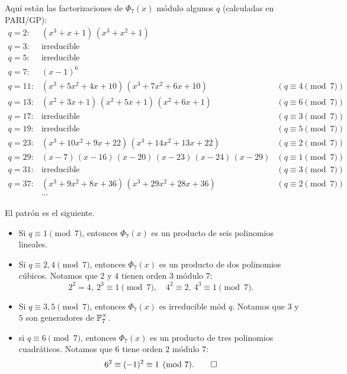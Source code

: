 \begin{ejemplo}
  Aquí están las factorizaciones de $\Phi_7 (x)$ módulo algunos $q$
  (calculadas en PARI/GP):
  \begin{align*}
    q = 2\colon & (x^3 + x + 1)\,(x^3 + x^2 + 1) \\
    q = 3\colon & \text{irreducible} \\
    q = 5\colon & \text{irreducible} \\
    q = 7\colon & (x - 1)^6 \\
    q = 11\colon & (x^3 + 5x^2 + 4x + 10)\,(x^3 + 7x^2 + 6x + 10) & (q \equiv 4 \pmod{7}) \\
    q = 13\colon & (x^2 + 3x + 1)\,(x^2 + 5x + 1)\,(x^2 + 6x + 1) & (q \equiv 6 \pmod{7}) \\
    q = 17\colon & \text{irreducible}  & (q \equiv 3 \pmod{7}) \\
    q = 19\colon & \text{irreducible}  & (q \equiv 5 \pmod{7}) \\
    q = 23\colon & (x^3 + 10x^2 + 9x + 22)\,(x^3 + 14x^2 + 13x + 22) & (q \equiv 2 \pmod{7}) \\
    q = 29\colon & (x - 7)\,(x - 16)\,(x - 20)\,(x - 23)\,(x - 24)\,(x - 29) & (q \equiv 1 \pmod{7}) \\
    q = 31\colon & \text{irreducible} & (q \equiv 3 \pmod{7}) \\
    q = 37\colon & (x^3 + 9x^2 + 8x + 36)\,(x^3 + 29x^2 + 28x + 36) & (q \equiv 2 \pmod{7}) \\
    & \cdots
  \end{align*}

  El patrón es el siguiente.
  \begin{itemize}
  \item Si $q \equiv 1 \pmod{7}$, entonces $\Phi_7 (x)$ es un producto de seis
    polinomios lineales.

  \item Si $q \equiv 2,4 \pmod{7}$, entonces $\Phi_7 (x)$ es un producto de dos
    polinomios cúbicos. Notamos que $2$ y $4$ tienen orden $3$ módulo $7$:
    \[ 2^2 = 4, ~ 2^3 \equiv 1 \pmod{7}, \quad
       4^2 \equiv 2, ~ 4^3 \equiv 1 \pmod{7}. \]

  \item Si $q \equiv 3,5 \pmod{7}$, entonces $\Phi_7 (x)$ es irreducible mód
    $q$. Notamos que $3$ y $5$ son generadores de $\mathbb{F}_7^\times$.

  \item si $q \equiv 6 \pmod{7}$, entonces $\Phi_7 (x)$ es un producto de tres
    polinomios cuadráticos. Notamos que $6$ tiene orden $2$ módulo $7$:
    \[ 6^2 \equiv (-1)^2 \equiv 1 \pmod{7}. \qedhere \]
  \end{itemize}
\end{ejemplo}

